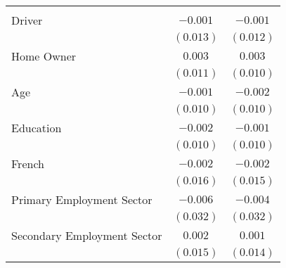 \begin{center}
\begin{tiny}
\begin{longtable}{l@{} c@{} c@{}}
                                                                                                       &                  &                  \\
\quad Driver                                                                                           & $-0.001$         & $-0.001$         \\
                                                                                                       & $(0.013)$        & $(0.012)$        \\
\quad Home Owner                                                                                       & $0.003$          & $0.003$          \\
                                                                                                       & $(0.011)$        & $(0.010)$        \\
\quad Age                                                                                              & $-0.001$         & $-0.002$         \\
                                                                                                       & $(0.010)$        & $(0.010)$        \\
\quad Education                                                                                        & $-0.002$         & $-0.001$         \\
                                                                                                       & $(0.010)$        & $(0.010)$        \\
\quad French                                                                                           & $-0.002$         & $-0.002$         \\
                                                                                                       & $(0.016)$        & $(0.015)$        \\
\quad Primary Employment Sector                                                                        & $-0.006$         & $-0.004$         \\
                                                                                                       & $(0.032)$        & $(0.032)$        \\
\quad Secondary Employment Sector                                                                      & $0.002$          & $0.001$          \\
                                                                                                       & $(0.015)$        & $(0.014)$        \\

\end{longtable}
\end{tiny}
\end{center}
